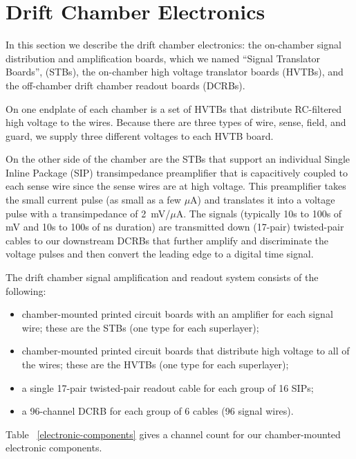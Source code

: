 \section{Drift Chamber Electronics}

In this section we describe the drift chamber electronics:
the on-chamber signal distribution and amplification boards, which
we named ``Signal Translator Boards'', (STBs),
the on-chamber high voltage translator boards (HVTBs), and the
off-chamber drift chamber readout boards (DCRBs).

On one endplate of each chamber is a set of HVTBs that distribute RC-filtered high voltage
to the wires.  Because there are three types of wire, sense, field, and guard, we supply
three different voltages to each HVTB board.  

On the other side of the chamber are the STBs that support an individual Single Inline Package
(SIP) transimpedance preamplifier that is capacitively coupled to each sense wire since the
sense wires are at high voltage.  This preamplifier takes the
small current pulse (as small as a few $\mu$A) and translates it into a voltage 
pulse with a transimpedance of 2~mV/$\mu$A.  The signals (typically
10s to 100s of mV and 10s to 100s of ns duration) are
transmitted down (17-pair) twisted-pair cables to our downstream DCRBs that further amplify and
discriminate the voltage pulses and then convert the leading edge
to a digital time signal.

The drift chamber signal amplification and readout system consists of the following:
\begin{itemize}
\item  chamber-mounted printed circuit boards with an amplifier for each signal wire; 
these are the STBs (one type for each superlayer);
\item  chamber-mounted printed circuit boards that distribute high voltage
to all of the wires; these are the HVTBs (one type for each superlayer);
\item a single 17-pair twisted-pair readout cable for each group of 16
SIPs;
\item a 96-channel DCRB for each group of 6 cables (96 signal wires).
\end{itemize}

Table ~\ref{electronic-components} gives a channel count for our chamber-mounted electronic components.


